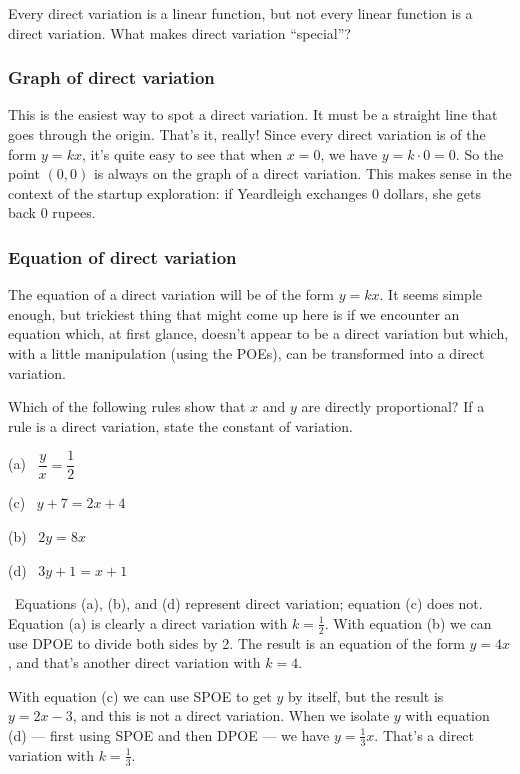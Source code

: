 Every direct variation is a linear function, but not every linear function is a direct variation. What makes direct variation ``special''?

\subsubsection{Graph of direct variation}

This is the easiest way to spot a direct variation. It must be a straight line that goes through the origin. That's it, really! Since every direct variation is of the form $y=kx$, it's quite easy to see that when $x=0$, we have $y = k\cdot0 = 0$. So the point $(0,0)$ is always on the graph of a direct variation. This makes sense in the context of the startup exploration: if Yeardleigh exchanges 0 dollars, she gets back 0 rupees.

\subsubsection{Equation of direct variation}

The equation of a direct variation will be of the form $y = kx$. It seems simple enough, but trickiest thing that might come up here is if we encounter an equation which, at first glance, doesn't appear to be a direct variation but which, with a little manipulation (using the POEs), can be transformed into a direct variation.

\begin{boxex}
Which of the following rules show that $x$ and $y$ are directly proportional? If a rule is a direct variation, state the constant of variation.

\begin{center}
\begin{minipage}{0.4\linewidth}
(a)~ $\dfrac{y}{x} = \dfrac{1}{2}$

(c)~ $y + 7 = 2x + 4$
\end{minipage}
%
\begin{minipage}{0.4\linewidth}
(b)~ $2y = 8x$

(d)~ $3y + 1 = x + 1$
\end{minipage}
\end{center}

\exsoln\ Equations (a), (b), and (d) represent direct variation; equation (c) does not. Equation (a) is clearly a direct variation with $k = \frac{1}{2}$. With equation (b) we can use DPOE to divide both sides by 2. The result is an equation of the form $y=4x$, and that's another direct variation with $k=4$.

With equation (c) we can use SPOE to get $y$ by itself, but the result is $y = 2x-3$, and this is not a direct variation. When we isolate $y$ with equation (d) --- first using SPOE and then DPOE --- we have $y = \frac{1}{3}x$. That's a direct variation with $k=\frac{1}{3}$.
\end{boxex}

